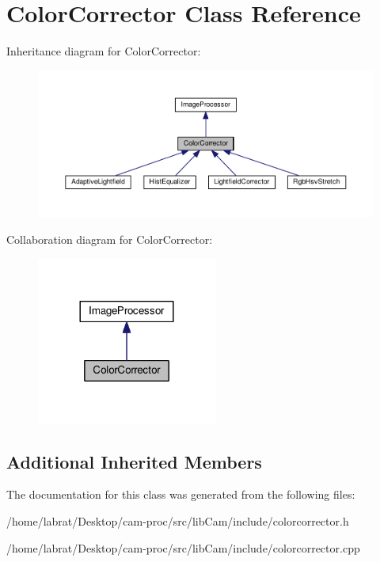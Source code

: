 \hypertarget{classColorCorrector}{}\section{Color\+Corrector Class Reference}
\label{classColorCorrector}


Inheritance diagram for Color\+Corrector\+:\nopagebreak
\begin{figure}[H]
\begin{center}
\leavevmode
\includegraphics[width=350pt]{classColorCorrector__inherit__graph}
\end{center}
\end{figure}


Collaboration diagram for Color\+Corrector\+:\nopagebreak
\begin{figure}[H]
\begin{center}
\leavevmode
\includegraphics[width=168pt]{classColorCorrector__coll__graph}
\end{center}
\end{figure}
\subsection*{Additional Inherited Members}


The documentation for this class was generated from the following files\+:\begin{DoxyCompactItemize}
\item 
/home/labrat/\+Desktop/cam-\/proc/src/lib\+Cam/include/colorcorrector.\+h\item 
/home/labrat/\+Desktop/cam-\/proc/src/lib\+Cam/include/colorcorrector.\+cpp\end{DoxyCompactItemize}
